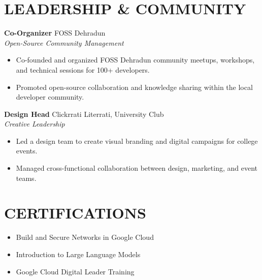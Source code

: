 \documentclass[11pt, a4paper]{article}
\newcommand{\cvitem}[3]{%
  \vspace{0.05in}
  \textbf{#1} \hfill \footnotesize{#2}\\
  \textit{#3}\vspace{0.05in}
}
\begin{document}
\section*{LEADERSHIP \& COMMUNITY}
\cvitem{Co-Organizer}{FOSS Dehradun}{Open-Source Community Management}
\begin{itemize}
    \item Co-founded and organized FOSS Dehradun community meetups, workshops, and technical sessions for 100+ developers.
    \item Promoted open-source collaboration and knowledge sharing within the local developer community.
\end{itemize}
\cvitem{Design Head}{Clickrrati Literrati, University Club}{Creative Leadership}
\begin{itemize}
    \item Led a design team to create visual branding and digital campaigns for college events.
    \item Managed cross-functional collaboration between design, marketing, and event teams.
\end{itemize}
\section*{CERTIFICATIONS}
\begin{itemize}
    \item Build and Secure Networks in Google Cloud
    \item Introduction to Large Language Models
    \item Google Cloud Digital Leader Training
\end{itemize}
\end{document}
